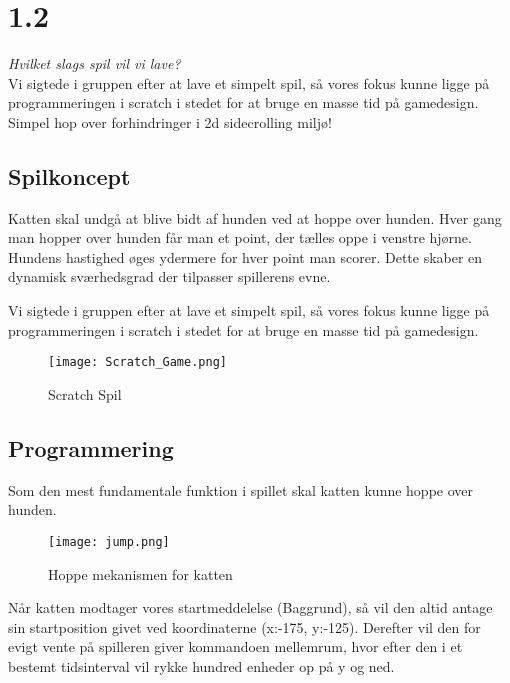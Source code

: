 \section{1.2}

\textit{Hvilket slags spil vil vi lave?}\\

Vi sigtede i gruppen efter at lave et simpelt spil, så vores fokus kunne ligge på programmeringen i scratch i stedet for at bruge en masse tid på gamedesign.\\

Simpel hop over forhindringer i 2d sidecrolling miljø!

\subsection{Spilkoncept}

Katten skal undgå at blive bidt af hunden ved at hoppe over hunden. Hver gang man hopper over hunden får man et point, der tælles oppe i venstre hjørne. Hundens hastighed øges ydermere for hver point man scorer. Dette skaber en dynamisk sværhedsgrad der tilpasser spillerens evne.

Vi sigtede i gruppen efter at lave et simpelt spil,
så vores fokus kunne ligge på programmeringen i scratch i stedet for at bruge en masse tid på gamedesign.\\

\begin{figure}[ht]
	\centering
	\texttt{[image: Scratch\_Game.png]}
	\caption{{Scratch Spil}}
	\label{fig:screen_dump}
\end{figure}

\clearpage
\subsection{Programmering}

Som den mest fundamentale funktion i spillet skal katten kunne hoppe over hunden.\\

\begin{figure}[ht]
	\centering
	\texttt{[image: jump.png]}
	\caption{{Hoppe mekanismen for katten}}
	\label{fig:jumpCat}
\end{figure}

Når katten modtager vores startmeddelelse (Baggrund), så vil den altid antage sin startposition givet ved koordinaterne (x:-175, y:-125). Derefter vil den for evigt vente på spilleren giver kommandoen mellemrum, hvor efter den i et bestemt tidsinterval vil rykke hundred enheder op på y og ned.\\

